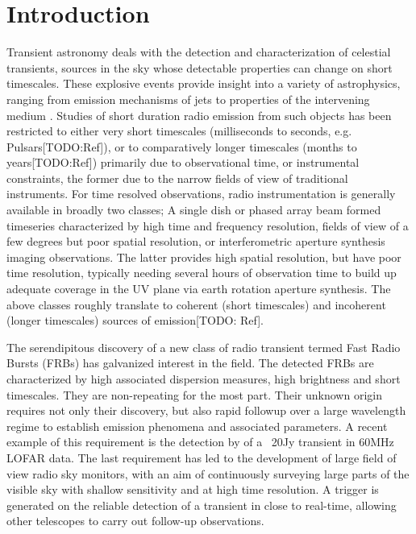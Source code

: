 \documentclass{ws-jai}
\begin{document}
\section{\label{sec:Introduction}Introduction}

\noindent Transient astronomy  deals with the detection  and characterization of
celestial transients, sources in the  sky whose detectable properties can change
on short timescales.   These explosive events provide insight into  a variety of
astrophysics,  ranging from  emission mechanisms  of jets  to properties  of the
intervening  medium \citep{fender2006lofar,lazio2009dynamic}.  Studies of  short
duration radio  emission from such  objects has  been restricted to  either very
short  timescales  (milliseconds to  seconds,  e.g.   Pulsars[TODO:Ref]), or  to
comparatively  longer timescales  (months to  years[TODO:Ref]) primarily  due to
observational time,  or instrumental constraints,  the former due to  the narrow
fields  of view  of traditional  instruments.  For  time resolved  observations,
radio instrumentation  is generally available  in broadly two classes;  A single
dish  or phased  array beam  formed timeseries  characterized by  high time  and
frequency  resolution,  fields  of  view  of a  few  degrees  but  poor  spatial
resolution,  or interferometric  aperture synthesis  imaging observations.   The
latter  provides  high  spatial  resolution,  but  have  poor  time  resolution,
typically  needing  several hours  of  observation  time  to build  up  adequate
coverage  in the  UV plane  via earth  rotation aperture  synthesis.  The  above
classes roughly translate to coherent  (short timescales) and incoherent (longer
timescales) sources of emission[TODO: Ref].

The serendipitous discovery of a new  class of radio transient termed Fast Radio
Bursts  (FRBs)\citep{spitler2015fast,   thornton2013population}  has  galvanized
interest in the  field.  The detected FRBs are characterized  by high associated
dispersion   measures,  high   brightness  and   short  timescales.    They  are
non-repeating for  the most part. Their  unknown origin requires not  only their
discovery, but also  rapid followup over a large wavelength  regime to establish
emission  phenomena  and  associated  parameters.   A  recent  example  of  this
requirement is the detection by  \cite{stewart2016lofar} of a ~20Jy transient in
60MHz LOFAR  data.  The  last requirement  has led to  the development  of large
field of  view radio sky monitors,  with an aim of  continuously surveying large
parts of the visible sky with shallow sensitivity and at high time resolution. A
trigger  is generated  on the  reliable  detection of  a transient  in close  to
real-time, allowing other telescopes to carry out follow-up observations.
\end{document}
